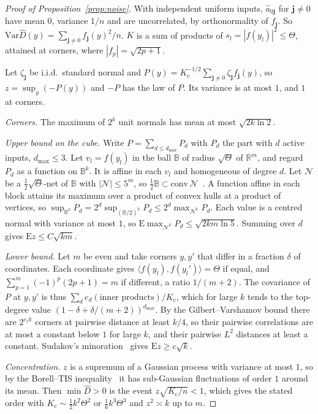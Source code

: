 \documentclass[10pt,a4paper]{article}
\newcommand{\Var}{\mathrm{Var}}
\theoremstyle{upright}
\begin{document}
\begin{proof}[Proof of Proposition~\ref{prop:noise}]
With independent uniform inputs, $\hat a_{0\mathbf{j}}$ for $\mathbf{j}\neq0$ have mean $0$, variance $1/n$ and are uncorrelated, by orthonormality of $f_{\mathbf{j}}$. So $\Var\hat D(y)=\sum_{\mathbf{j}\neq0}f_{\mathbf{j}}(y)^2/n$. $K$ is a sum of products of $s_l=|f(y_l)|^2\leq\Theta$, attained at corners, where $|f_p|=\sqrt{2p+1}$.

Let $\zeta_{\mathbf{j}}$ be i.i.d.\ standard normal and $P(y)=K_{\mathrm c}^{-1/2}\sum_{\mathbf{j}\neq0}\zeta_{\mathbf{j}}f_{\mathbf{j}}(y)$, so $z=\sup_y(-P(y))$ and $-P$ has the law of $P$. Its variance is at most $1$, and $1$ at corners.

\emph{Corners.} The maximum of $2^k$ unit normals has mean at most $\sqrt{2k\ln2}$.

\emph{Upper bound on the cube.} Write $P=\sum_{d\leq d_{\max}}P_d$ with $P_d$ the part with $d$ active inputs, $d_{\max}\leq3$. Let $v_l=f(y_l)$ in the ball $\mathbb B$ of radius $\sqrt\Theta$ of $\mathbb R^m$, and regard $P_d$ as a function on $\mathbb B^k$. It is affine in each $v_l$ and homogeneous of degree $d$. Let $\mathcal N$ be a $\frac12\sqrt\Theta$-net of $\mathbb B$ with $|\mathcal N|\leq5^m$, so $\frac12\mathbb B\subset\mathrm{conv}\,\mathcal N$~\citep{vershynin2018high}. A function affine in each block attains its maximum over a product of convex hulls at a product of vertices, so $\sup_{\mathbb B^k}P_d=2^d\sup_{(\mathbb B/2)^k}P_d\leq2^d\max_{\mathcal N^k}P_d$. Each value is a centred normal with variance at most $1$, so $\mathrm{E}\max_{\mathcal N^k}P_d\leq\sqrt{2km\ln5}$. Summing over $d$ gives $\mathrm{E}z\leq C\sqrt{km}$.

\emph{Lower bound.} Let $m$ be even and take corners $y,y'$ that differ in a fraction $\delta$ of coordinates. Each coordinate gives $\langle f(y_l),f(y_l')\rangle=\Theta$ if equal, and $\sum_{p=1}^m(-1)^p(2p+1)=m$ if different, a ratio $1/(m+2)$. The covariance of $P$ at $y,y'$ is thus $\sum_d e_d(\text{inner products})/K_{\mathrm c}$, which for large $k$ tends to the top-degree value $(1-\delta+\delta/(m+2))^{d_{\max}}$. By the Gilbert--Varshamov bound there are $2^{c_1k}$ corners at pairwise distance at least $k/4$, so their pairwise correlations are at most a constant below $1$ for large $k$, and their pairwise $L^2$ distances at least a constant. Sudakov's minoration~\citep{vershynin2018high} gives $\mathrm{E}z\geq c\sqrt k$.

\emph{Concentration.} $z$ is a supremum of a Gaussian process with variance at most $1$, so by the Borell--TIS inequality~\citep{vershynin2018high} it has sub-Gaussian fluctuations of order $1$ around its mean. Then $\min\hat D>0$ is the event $z\sqrt{K_{\mathrm c}/n}<1$, which gives the stated order with $K_{\mathrm c}\sim\frac12k^2\Theta^2$ or $\frac16k^3\Theta^3$ and $z^2\asymp k$ up to $m$.
\end{proof}
\end{document}

